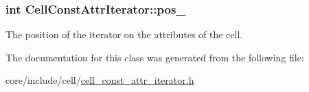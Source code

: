 \subsubsection[{pos\+\_\+}]{\setlength{\rightskip}{0pt plus 5cm}int Cell\+Const\+Attr\+Iterator\+::pos\+\_\+\hspace{0.3cm}{\ttfamily [private]}}\label{classCellConstAttrIterator_aa223116556fa8e1bd25d31d1b8f1a01f}
The position of the iterator on the attributes of the cell. 

The documentation for this class was generated from the following file\+:\begin{DoxyCompactItemize}
\item 
core/include/cell/\hyperlink{cell__const__attr__iterator_8h}{cell\+\_\+const\+\_\+attr\+\_\+iterator.\+h}\end{DoxyCompactItemize}
